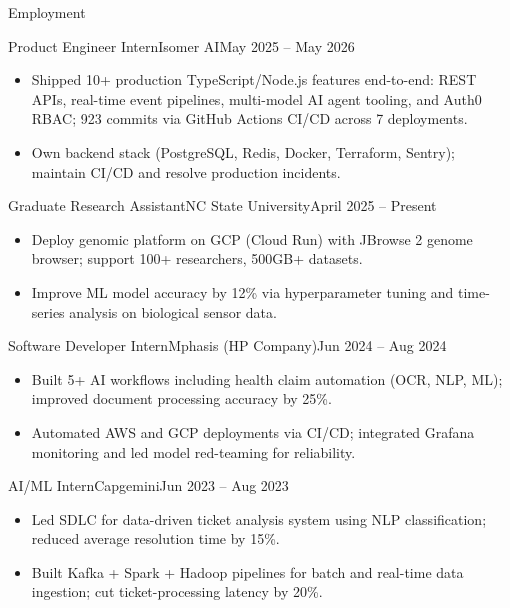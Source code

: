 \documentclass[]{mcdowellcv}
\begin{document}
\makeheader

\begin{cvsection}{Employment}
  \begin{cvsubsection}{Product Engineer Intern}{Isomer AI}{May 2025 -- May 2026}
    \begin{itemize}
      \item Shipped 10+ production TypeScript/Node.js features end-to-end: REST APIs, real-time event pipelines, multi-model AI agent tooling, and Auth0 RBAC; 923 commits via GitHub Actions CI/CD across 7 deployments.
      \item Own backend stack (PostgreSQL, Redis, Docker, Terraform, Sentry); maintain CI/CD and resolve production incidents.
    \end{itemize}
    \vspace{-1.5pt}
  \end{cvsubsection}

  \begin{cvsubsection}{Graduate Research Assistant}{NC State University}{April 2025 -- Present}
    \begin{itemize}
      \item Deploy genomic platform on GCP (Cloud Run) with JBrowse 2 genome browser; support 100+ researchers, 500GB+ datasets.
      \item Improve ML model accuracy by 12\% via hyperparameter tuning and time-series analysis on biological sensor data.
    \end{itemize}
    \vspace{-1.5pt}
  \end{cvsubsection}

  \begin{cvsubsection}{Software Developer Intern}{Mphasis (HP Company)}{Jun 2024 -- Aug 2024}
    \begin{itemize}
      \item Built 5+ AI workflows including health claim automation (OCR, NLP, ML); improved document processing accuracy by 25\%.
      \item Automated AWS and GCP deployments via CI/CD; integrated Grafana monitoring and led model red-teaming for reliability.
    \end{itemize}
    \vspace{-1.5pt}
  \end{cvsubsection}

  \begin{cvsubsection}{AI/ML Intern}{Capgemini}{Jun 2023 -- Aug 2023}
    \begin{itemize}
      \item Led SDLC for data-driven ticket analysis system using NLP classification; reduced average resolution time by 15\%.
      \item Built Kafka + Spark + Hadoop pipelines for batch and real-time data ingestion; cut ticket-processing latency by 20\%.
    \end{itemize}
    \vspace{-1.5pt}
  \end{cvsubsection}
\end{cvsection}
\end{document}
